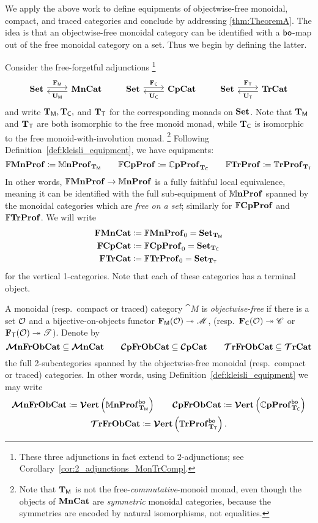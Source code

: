 \documentclass[11pt,oneside,article]{memoir}
\begin{document}
We apply the above work to define equipments of objectwise-free monoidal, compact, and traced
categories and conclude by addressing \ref{thm:TheoremA}. The idea is that an objectwise-free
monoidal category can be identified with a $\mathsf{bo}$-map out of the free monoidal category on a set.
Thus we begin by defining the latter.

Consider the free-forgetful adjunctions%
\footnote{
  These three adjunctions in fact extend to 2-adjunctions; see
  Corollary~\ref{cor:2_adjunctions_MonTrComp}.
}
\begin{equation}
    \label{eqn:adjunctions}
  \Adjoint{\Set}{\MonCat}{\FM}{\UM}
  \qquad
  \Adjoint{\Set}{\CompCat}{\FC}{\UC}
  \qquad
  \Adjoint{\Set}{\TrCat}{\FT}{\UT}
\end{equation}
and write $\mathbf{T}_{\mathsf{M}},\mathbf{T}_{\mathsf{C}},$ and $\mathbf{T}_{\mathsf{T}}$ for the corresponding monads on $\mathbf{Set}$. Note that $\mathbf{T}_{\mathsf{M}}$ and $\mathbf{T}_{\mathsf{T}}$ are
both isomorphic to the free monoid monad, while $\mathbf{T}_{\mathsf{C}}$ is isomorphic to the free
monoid-with-involution monad.%
\footnote{
   Note that $\mathbf{T}_{\mathsf{M}}$ is not the free-\emph{commutative}-monoid monad, even though the objects of
   $\mathbf{MnCat}$ are \emph{symmetric} monoidal categories, because the symmetries are encoded by natural
   isomorphisms, not equalities.
}
Following Definition~\ref{def:kleisli_equipment}, we have equipments:
\[
  \mathbb{F}\mathbf{MnProf}  \coloneqq \mathbb{M}\mathbf{nProf}_{\mathbf{T}_{\mathsf{M}}}
  \qquad
  \mathbb{F}\mathbf{CpProf} \coloneqq \mathbb{C}\mathbf{pProf}_{\mathbf{T}_{\mathsf{C}}}
  \qquad
  \mathbb{F}\mathbf{TrProf}   \coloneqq \mathbb{T}\mathbf{rProf}_{\mathbf{T}_{\mathsf{T}}}
\]
In other words, $\mathbb{F}\mathbf{MnProf}\to\mathbb{M}\mathbf{nProf}$ is a fully faithful local equivalence, meaning it can be
identified with the full sub-equipment of $\mathbb{M}\mathbf{nProf}$ spanned by the monoidal categories which are
\emph{free on a set}; similarly for $\mathbb{F}\mathbf{CpProf}$ and $\mathbb{F}\mathbf{TrProf}$. We will write
\begin{align*}
  \mathbf{FMnCat}&\coloneqq\mathbb{F}\mathbf{MnProf}_0=\mathbf{Set}_{\mathbf{T}_{\mathsf{M}}}\\
  \mathbf{FCpCat}&\coloneqq\mathbb{F}\mathbf{CpProf}_0=\mathbf{Set}_{\mathbf{T}_{\mathsf{C}}}\\
  \mathbf{FTrCat}&\coloneqq\mathbb{F}\mathbf{TrProf}_0=\mathbf{Set}_{\mathbf{T}_{\mathsf{T}}}
\end{align*}
for the vertical 1-categories. Note that each of these categories has a terminal object.

\begin{definition}
    \label{def:free_on_objects}
  A monoidal (resp.\ compact or traced) category $\cat{M}$ is \emph{objectwise-free} if there is a
  set $\mathcal{O}$ and a bijective-on-objects functor $\mathbf{F}_{\mathsf{M}}(\mathcal{O})\twoheadrightarrow\mathscr{M}$, (resp.\
  $\mathbf{F}_{\mathsf{C}}(\mathcal{O})\twoheadrightarrow\mathscr{C}$ or $\mathbf{F}_{\mathsf{T}}(\mathcal{O})\twoheadrightarrow\mathscr{T}$). Denote by
  \[
    \bm{\mathcal{M}}\mathbf{nFrObCat}\subseteq\bm{\mathcal{M}}\mathbf{nCat}\qquad\bm{\mathcal{C}}\mathbf{pFrObCat}\subseteq\bm{\mathcal{C}}\mathbf{pCat}\qquad\bm{\mathcal{T}}\mathbf{rFrObCat}\subseteq\bm{\mathcal{T}}\mathbf{rCat}
  \]
  the full 2-subcategories spanned by the objectwise-free monoidal (resp.\ compact or traced)
  categories. In other words, using Definition~\ref{def:kleisli_equipment} we may write
  \begin{gather*}
    \bm{\mathcal{M}}\mathbf{nFrObCat} \coloneqq \bm{\mathcal{V}}\mathbf{ert}\left(\mathbb{M}\mathbf{nProf}_{\mathbf{T}_{\mathsf{M}}}^{\mathsf{bo}}\right) \qquad
    \bm{\mathcal{C}}\mathbf{pFrObCat} \coloneqq \bm{\mathcal{V}}\mathbf{ert}\left(\mathbb{C}\mathbf{pProf}_{\mathbf{T}_{\mathsf{C}}}^{\mathsf{bo}}\right) \\
    \bm{\mathcal{T}}\mathbf{rFrObCat} \coloneqq \bm{\mathcal{V}}\mathbf{ert}\left(\mathbb{T}\mathbf{rProf}_{\mathbf{T}_{\mathsf{T}}}^{\mathsf{bo}}\right).
  \end{gather*}
\end{definition}
\end{document}
